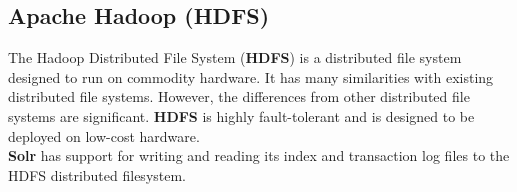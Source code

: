 \subsection{Apache Hadoop (HDFS)}
The Hadoop Distributed File System (\textbf{HDFS}) is a distributed file system designed to run on commodity hardware. It has many similarities with existing distributed file systems. However, the differences from other distributed file systems are significant. \textbf{HDFS} is highly fault-tolerant and is designed to be deployed on low-cost hardware. \\
\textbf{Solr} has support for writing and reading its index and transaction log files to the HDFS distributed filesystem.